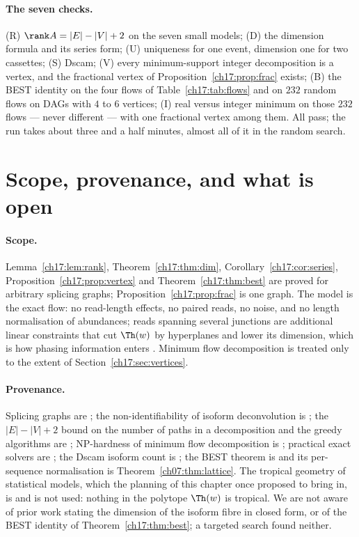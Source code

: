 \paragraph{The seven checks.} (R) $\rank A=|E|-|V|+2$ on the seven small models; (D) the
dimension formula and its series form; (U) uniqueness for one event, dimension one for two
cassettes; (S) Dscam; (V) every minimum-support integer decomposition is a vertex, and the
fractional vertex of Proposition~\ref{ch17:prop:frac} exists; (B) the BEST identity on the four
flows of Table~\ref{ch17:tab:flows} and on $232$ random flows on DAGs with $4$ to $6$ vertices;
(I) real versus integer minimum on those $232$ flows --- never different --- with one
fractional vertex among them. All pass; the run takes about three and a half minutes, almost
all of it in the random search.

\section{Scope, provenance, and what is open}

\paragraph{Scope.} Lemma~\ref{ch17:lem:rank}, Theorem~\ref{ch17:thm:dim},
Corollary~\ref{ch17:cor:series}, Proposition~\ref{ch17:prop:vertex} and Theorem~\ref{ch17:thm:best} are
proved for arbitrary splicing graphs; Proposition~\ref{ch17:prop:frac} is one graph. The model is
the exact flow: no read-length effects, no paired reads, no noise, and no length
normalisation of abundances; reads spanning several junctions are additional linear
constraints that cut $\Th(w)$ by hyperplanes and lower its dimension, which is how phasing
information enters \cite{HJXW09}. Minimum flow decomposition is treated only to the extent
of Section~\ref{ch17:sec:vertices}.

\paragraph{Provenance.} Splicing graphs are \cite{HAST02}; the non-identifiability of
isoform deconvolution is \cite{LSGB08,HJXW09}; the $|E|-|V|+2$ bound on the number of paths
in a decomposition and the greedy algorithms are \cite{VCCM08}; NP-hardness of minimum flow
decomposition is \cite{HHKS12}; practical exact solvers are \cite{KKO18,DT22}; the Dscam
isoform count is \cite{SCH00}; the BEST theorem is \cite{BEST,SmithTutte} and its
per-sequence normalisation is Theorem~\ref{ch07:thm:lattice}. The tropical geometry of statistical models,
which the planning of this chapter once proposed to bring in, is \cite{PS04} and is not used:
nothing in the polytope $\Th(w)$ is tropical. We are not aware of prior work stating the
dimension of the isoform fibre in closed form, or of the BEST identity of
Theorem~\ref{ch17:thm:best}; a targeted search found neither.

